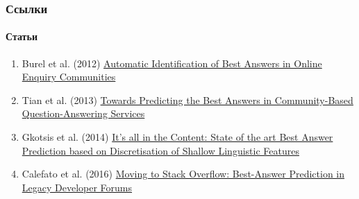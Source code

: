 \documentclass[10pt]{beamer}
\begin{document}
\begin{frame}
\frametitle{Ссылки}
\framesubtitle{Статьи}

\begin{enumerate}
    \item 
    	\begin{thebibliography}{99}
             Burel et al. (2012)
            \newblock \href{https://dl.acm.org/citation.cfm?id=2345733}{Automatic Identification of Best Answers in Online Enquiry Communities}
        \end{thebibliography}
    \item 
    	\begin{thebibliography}{99}
             Tian et al. (2013)
            \newblock \href{http://www.public.asu.edu/~bli24/Papers/ICWSM2013.pdf}{Towards Predicting the Best Answers in Community-Based Question-Answering Services}
        \end{thebibliography}
    \item 
    	\begin{thebibliography}{99}
             Gkotsis et al. (2014)
            \newblock \href{https://dl.acm.org/citation.cfm?id=2615569.2615681}{It’s all in the Content: State of the art Best Answer Prediction based on Discretisation of Shallow Linguistic Features}
        \end{thebibliography}
    \item 
    	\begin{thebibliography}{99}
             Calefato et al. (2016)
            \newblock \href{https://dl.acm.org/citation.cfm?id=2962585}{Moving to Stack Overflow: Best-Answer Prediction in Legacy Developer Forums}
        \end{thebibliography}
\end{enumerate}

\end{frame}


\end{document}

